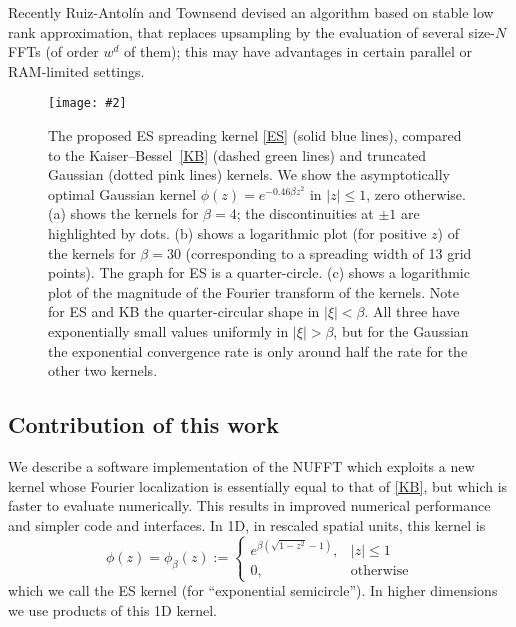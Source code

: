 \documentclass[10pt]{article}
\newcommand{\be}{\begin{equation}}
\newcommand{\ee}{\end{equation}}
\newcommand{\bfi}{\begin{figure}}
\newcommand{\efi}{\end{figure}}
\newcommand{\ca}[2]{\caption{#1 \label{#2}}}
\newcommand{\ig}[2]{\texttt{[image: \#2]}}
\newcommand{\freq}{\beta}          %
\newcommand{\KB}{Kaiser--Bessel}
\begin{document}
Recently Ruiz-Antol\'in and Townsend
\cite{townsendnufft} devised an algorithm
based on stable low rank approximation, that
replaces upsampling by the evaluation of several size-$N$
FFTs (of order $w^d$ of them);
this may have advantages in certain parallel or RAM-limited settings.



\bfi[t]  %
\hspace{-2ex}\ig{width=6.7in}{kernel.eps}
\ca{The proposed ES spreading kernel
  \eqref{ES} (solid blue lines), compared to the \KB\ \eqref{KB}
  (dashed green lines) and truncated Gaussian (dotted pink lines) kernels.
  We show the asymptotically optimal
  Gaussian kernel $\phi(z) = e^{-0.46 \beta z^2}$ in $|z|\le 1$, zero otherwise.
  (a) shows the kernels for $\freq=4$; the discontinuities at
  $\pm 1$ are highlighted by dots.
  (b) shows a logarithmic plot (for positive $z$) of the
  kernels for $\freq=30$
  (corresponding to a spreading width of 13 grid points).
  The graph for ES is a quarter-circle.
  (c) shows a logarithmic plot of the magnitude of the
  Fourier transform of the kernels.
  Note for ES and KB the quarter-circular shape in $|\xi|<\freq$.
  All three have exponentially small values uniformly in $|\xi|>\freq$, but
  for the Gaussian the exponential convergence rate is only around half
  the rate for the other two kernels.
}{f:kernel}
\efi


\subsection{Contribution of this work}

We describe a software implementation of the NUFFT
which exploits a new kernel whose Fourier localization 
is essentially equal to that of \eqref{KB},
but which is faster to evaluate numerically.
This results in improved numerical performance and simpler code and interfaces.
In 1D, in rescaled spatial units, this kernel is
\be
\phi(z) = \phi_\freq(z) :=
\left\{\begin{array}{ll}
e^{\freq (\sqrt{1-z^2}-1)}, & |z|\le 1\\
0, & \mbox{otherwise}
\end{array}
\right.
\label{ES}
\ee
which we call the ES kernel (for %
``exponential semicircle'').
In higher dimensions we use products of this 1D kernel.
\end{document}
